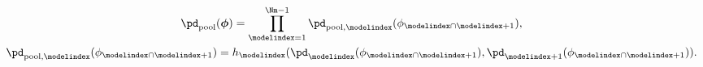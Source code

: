 \begin{gather}
  \pd_{\text{pool}}(\boldsymbol{\phi}) = 
    \prod_{\modelindex = 1}^{\Nm - 1}
    \pd_{\text{pool}, \modelindex}(\phi_{\modelindex \cap \modelindex + 1}),
  \\
  \pd_{\text{pool}, \modelindex}(\phi_{\modelindex \cap \modelindex + 1}) =
  h_{\modelindex}(\pd_{\modelindex}(\phi_{\modelindex \cap \modelindex + 1}), \pd_{\modelindex + 1}(\phi_{\modelindex \cap \modelindex + 1})).
  \label{eqn:bad-alternative-one}
\end{gather}